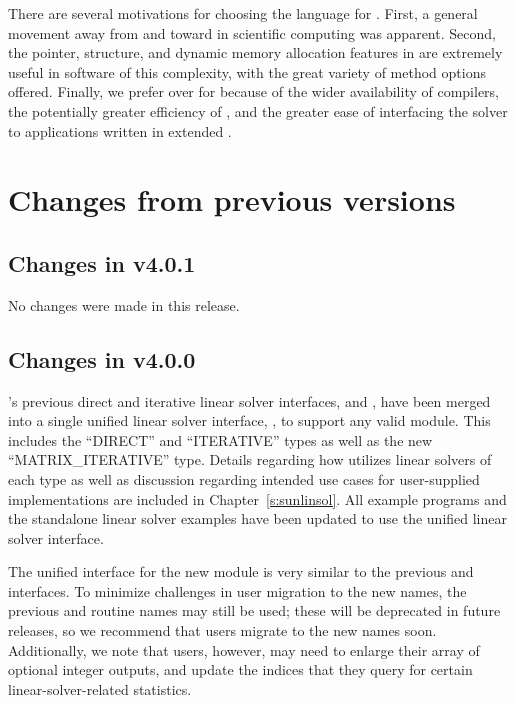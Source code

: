 There are several motivations for choosing the {\CC} language for {\ida}.
First, a general movement away from {\F} and toward {\CC} in scientific
computing was apparent.  Second, the pointer, structure, and dynamic
memory allocation features in {\CC} are extremely useful in software of
this complexity, with the great variety of method options offered.
Finally, we prefer {\CC} over {\CPP} for {\ida} because of the wider
availability of {\CC} compilers, the potentially greater efficiency of {\CC},
and the greater ease of interfacing the solver to applications written
in extended {\F}.


\section{Changes from previous versions}

\subsection*{Changes in v4.0.1}

No changes were made in this release.

\subsection*{Changes in v4.0.0}

{\ida}'s previous direct and iterative linear solver interfaces,
{\idadls} and {\idaspils}, have been merged into a single unified linear
solver interface, {\idals}, to support any valid {\sunlinsol} module.
This includes the ``DIRECT'' and ``ITERATIVE'' types as well as the new
``MATRIX\_ITERATIVE'' type. Details regarding how {\idals} utilizes linear
solvers of each type as well as discussion regarding intended use cases for
user-supplied {\sunlinsol} implementations are included in
Chapter~\ref{s:sunlinsol}. All {\ida} example programs and the standalone
linear solver examples have been updated to use the unified linear solver
interface.

The unified interface for the new {\idals} module is very similar to the
previous {\idadls} and {\idaspils} interfaces. To minimize challenges in user
migration to the new names, the previous {\CC} and {\F} routine names may still
be used; these will be deprecated in future releases, so we recommend that users
migrate to the new names soon. Additionally, we note that {\F} users, however,
may need to enlarge their  array of optional integer outputs, and
update the indices that they query for certain linear-solver-related
statistics.


